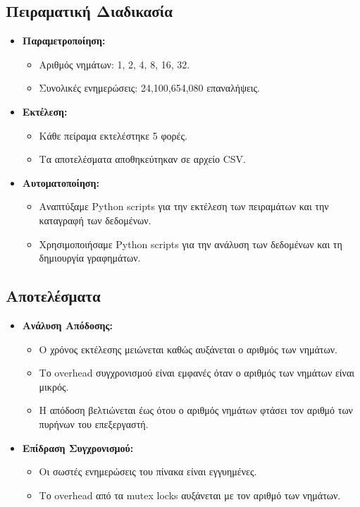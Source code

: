 \documentclass{article}
\begin{document}
\subsection*{Πειραματική Διαδικασία}
\begin{itemize}
    \item \textbf{Παραμετροποίηση:}
    \begin{itemize}
        \item Αριθμός νημάτων: 1, 2, 4, 8, 16, 32.
        \item Συνολικές ενημερώσεις: 24,100,654,080 επαναλήψεις.
    \end{itemize}
    \item \textbf{Εκτέλεση:}
    \begin{itemize}
        \item Κάθε πείραμα εκτελέστηκε 5 φορές.
        \item Τα αποτελέσματα αποθηκεύτηκαν σε αρχείο CSV.
    \end{itemize}
    \item \textbf{Αυτοματοποίηση:}
    \begin{itemize}
        \item Αναπτύξαμε Python scripts για την εκτέλεση των πειραμάτων και την καταγραφή των δεδομένων.
        \item Χρησιμοποιήσαμε Python scripts για την ανάλυση των δεδομένων και τη δημιουργία γραφημάτων.
    \end{itemize}
\end{itemize}
\subsection*{Αποτελέσματα}
\begin{itemize}
    \item \textbf{Ανάλυση Απόδοσης:}
    \begin{itemize}
        \item Ο χρόνος εκτέλεσης μειώνεται καθώς αυξάνεται ο αριθμός των νημάτων.
        \item Το overhead συγχρονισμού είναι εμφανές όταν ο αριθμός των νημάτων είναι μικρός.
        \item Η απόδοση βελτιώνεται έως ότου ο αριθμός νημάτων φτάσει τον αριθμό των πυρήνων του επεξεργαστή.
    \end{itemize}
    \item \textbf{Επίδραση Συγχρονισμού:}
    \begin{itemize}
        \item Οι σωστές ενημερώσεις του πίνακα είναι εγγυημένες.
        \item Το overhead από τα mutex locks αυξάνεται με τον αριθμό των νημάτων.
    \end{itemize}
\end{itemize}
\end{document}
